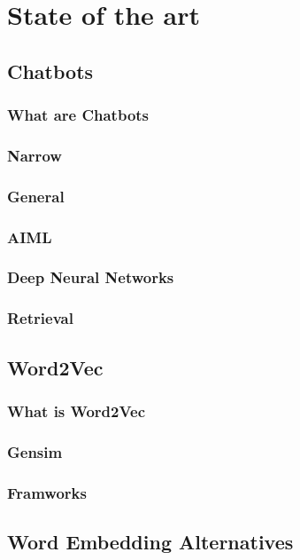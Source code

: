 \chapter{State of the art}
\label{chap:state-of-the-art}

\section{Chatbots}
\subsection{What are Chatbots}
\subsection{Narrow}
\subsection{General}
\subsection{AIML}
\subsection{Deep Neural Networks}
\subsection{Retrieval}


\section{Word2Vec}
\subsection{What is Word2Vec}
\subsection{Gensim}
\subsection{Framworks}


\section{Word Embedding Alternatives}
